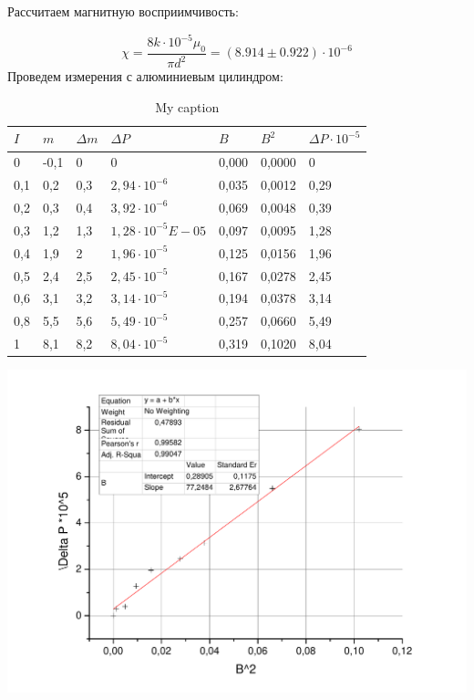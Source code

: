 \documentclass[a4paper,12pt]{article}
\begin{document}
	Рассчитаем магнитную восприимчивость:
	
	$$
	\chi = \frac{8k\cdot 10^{-5}\mu_0}{\pi d^2} = \left(8.914\pm0.922\right)\cdot 10^{-6}
	$$
	\newpage
	Проведем измерения с алюминиевым цилиндром:
	
	\begin{table}[h!]
		\centering
		\caption{My caption}
		\label{my-label}
		\begin{tabular}{|l|l|l|l|l|l|l|}
			\hline
			$I$   & $m$    & $\Delta m$   & $\Delta P $      & $B$     & $B^2$ & $\Delta P\cdot10^{-5}$ \\ \hline
			0   & -0,1 & 0   & 0        & 0,000 & 0,0000              & 0                       \\ \hline
			0,1 & 0,2  & 0,3 & $2,94\cdot 10^{-6}$ & 0,035 & 0,0012              & 0,29                    \\ \hline
			0,2 & 0,3  & 0,4 & $3,92\cdot 10^{-6}$ & 0,069 & 0,0048              & 0,39                    \\ \hline
			0,3 & 1,2  & 1,3 & $1,28\cdot 10^{-5}E-05$ & 0,097 & 0,0095              & 1,28                    \\ \hline
			0,4 & 1,9  & 2   & $1,96\cdot 10^{-5}$ & 0,125 & 0,0156              & 1,96                    \\ \hline
			0,5 & 2,4  & 2,5 & $2,45\cdot 10^{-5}$ & 0,167 & 0,0278              & 2,45                    \\ \hline
			0,6 & 3,1  & 3,2 & $3,14\cdot 10^{-5}$ & 0,194 & 0,0378              & 3,14                    \\ \hline
			0,8 & 5,5  & 5,6 & $5,49\cdot 10^{-5}$ & 0,257 & 0,0660              & 5,49                    \\ \hline
			1   & 8,1  & 8,2 & $8,04\cdot 10^{-5}$ & 0,319 & 0,1020              & 8,04                    \\ \hline
		\end{tabular}
\end{table}	
		\includegraphics[width = 0.7\linewidth]{graph3}
		
\end{document}
